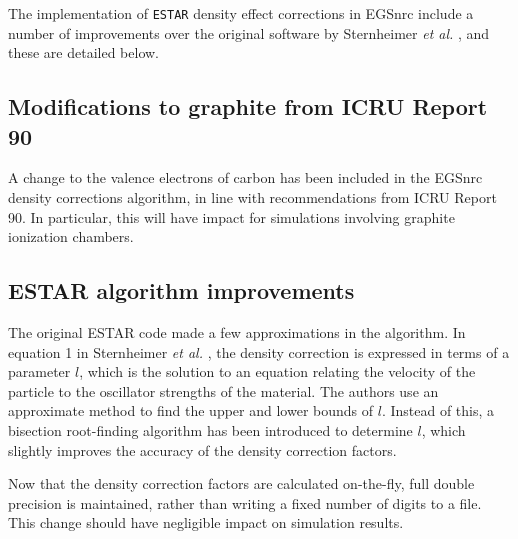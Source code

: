 The implementation of {\tt ESTAR} density effect corrections in EGSnrc include a number of improvements over the original software by Sternheimer {\em et al.} \cite{St82}, and these are detailed below.

\subsection{Modifications to graphite from ICRU Report 90}
A change to the valence electrons of carbon has been included in the EGSnrc density corrections algorithm, in line with recommendations from ICRU Report 90. In particular, this will have impact for simulations involving graphite ionization chambers.

\subsection{ESTAR algorithm improvements}
The original ESTAR code made a few approximations in the algorithm. In equation 1 in Sternheimer {\em et al.} \cite{St82}, the density correction is expressed in terms of a parameter $l$, which is the solution to an equation relating the velocity of the particle to the oscillator strengths of the material. The authors use an approximate method to find the upper and lower bounds of $l$. Instead of this, a bisection root-finding algorithm has been introduced to determine $l$, which slightly improves the accuracy of the density correction factors.

Now that the density correction factors are calculated on-the-fly, full double precision is maintained, rather than writing a fixed number of digits to a file. This change should have negligible impact on simulation results.

